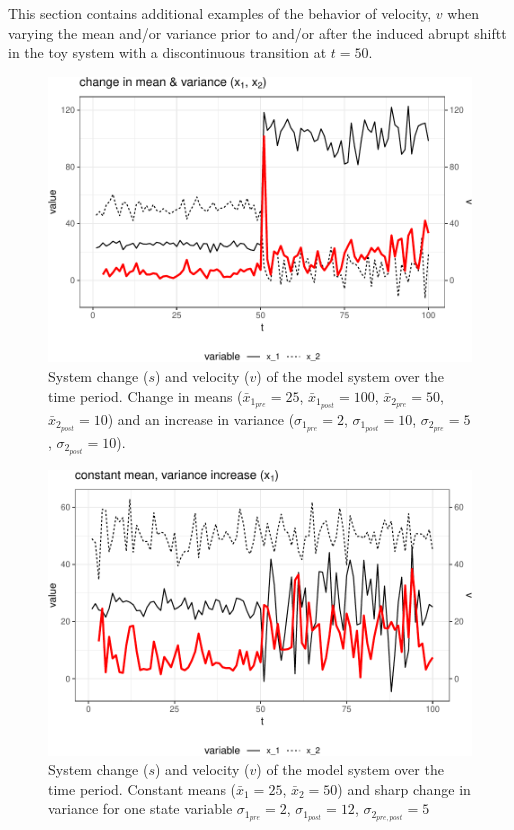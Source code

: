 \documentclass[12pt,twoside,openany]{reedthesis}
\begin{document}
This section contains additional examples of the behavior of velocity, \(v\) when varying the mean and/or variance prior to and/or after the induced abrupt shiftt in the toy system with a discontinuous transition at \(t=50\).
\begin{figure}
\includegraphics[width=0.85\linewidth]{_myDissertation_files/figure-latex/velocSysEx2-1} \caption{System change ($s$) and velocity ($v$) of the model system over the time period. Change in means ($\bar{x}_{1_{pre}}=25$, $\bar{x}_{1_{post}}=100$, $\bar{x}_{2_{pre}}=50$, $\bar{x}_{2_{post}}=10$) and an increase in variance ($\sigma_{1_{pre}}=2$, $\sigma_{1_{post}}=10$, $\sigma_{2_{pre}}=5$,  $\sigma_{2_{post}}=10$).}\label{fig:velocSysEx2}
\end{figure}
\begin{figure}
\includegraphics[width=0.85\linewidth]{_myDissertation_files/figure-latex/velocSysEx3-1} \caption{System change ($s$) and velocity ($v$) of the model system over the time period. Constant means ($\bar{x}_1=25$, $\bar{x}_2=50$) and sharp change in variance for one state variable $\sigma_{1_{pre}} = 2$, $\sigma_{1_{post}} = 12$, $\sigma_{2_{pre,post}} = 5$}\label{fig:velocSysEx3}
\end{figure}
\end{document}
